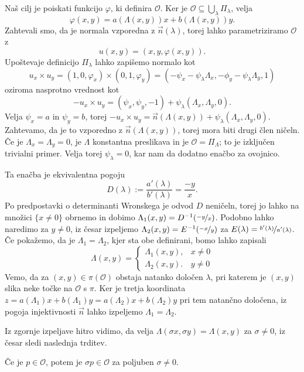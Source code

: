 Naš cilj je poiskati funkcijo $\varphi$, ki definira $\mathcal{O}$.
Ker je $\mathcal{O} \subseteq \bigcup_\lambda \Pi_\lambda$, velja
\[
	\varphi(x, y) = a(\Lambda(x, y)) x + b(\Lambda(x, y)) y.
\]
Zahtevali smo, da je normala vzporedna z $\vec{n}(\lambda)$, torej lahko
parametriziramo $\mathcal{O}$ z
\[
	u(x, y) = (x, y, \varphi(x, y)).
\]
Upoštevaje definicijo $\Pi_\lambda$ lahko zapišemo normalo kot
\[
	u_x \times u_y
	= (1, 0, \varphi_x) \times (0, 1, \varphi_y)
	= (- \psi_x - \psi_\lambda \Lambda_x, -\phi_y - \psi_\lambda \Lambda_y, 1)
\]
oziroma nasprotno vrednost kot
\[
	-u_x \times u_y = (\psi_x, \psi_y, -1) + \psi_\lambda (\Lambda_x, \Lambda_y,
	0).
\]
Velja $\psi_x = a$ in $\psi_y = b$, torej $-u_x \times u_y = \vec{n}(\Lambda(x,
y)) + \psi_\lambda(\Lambda_x, \Lambda_y, 0)$.
Zahtevamo, da je to vzporedno z $\vec{n}(\Lambda(x, y))$, torej mora biti drugi
člen ničeln.
Če je $\Lambda_x = \Lambda_y = 0$, je $\Lambda$ konstantna preslikava in je
$\mathcal{O} = \Pi_\Lambda$; to je izključen trivialni primer.
Velja torej $\psi_\lambda = 0$, kar nam da dodatno enačbo za ovojnico.


Ta enačba je ekvivalentna pogoju
\[
	D(\lambda) := \frac{a'(\lambda)}{b'(\lambda)} = \frac{-y}{x}.
\]
Po predpostavki o determinanti Wronskega je odvod $D$ neničeln, torej jo lahko
na množici $\{x \ne 0\}$ obrnemo in dobimo $\Lambda_1(x, y) =
D^{-1}(\nicefrac{-y}{x})$.
Podobno lahko naredimo za $y \ne 0$, iz česar izpeljemo $\Lambda_2(x, y) =
E^{-1}(\nicefrac{-x}{y})$ za $E(\lambda) = \nicefrac{b'(\lambda)}{a'(\lambda)}$.
Če pokažemo, da je $\Lambda_1 = \Lambda_2$, kjer sta obe definirani, bomo lahko
zapisali
\[
	\Lambda(x, y) =
	\begin{cases}
		\Lambda_1(x, y), & x \ne 0 \\
		\Lambda_2(x, y). & y \ne 0
	\end{cases}
\]
Vemo, da za $(x, y) \in \pi(\mathcal{O})$ obstaja natanko določen $\lambda$, pri
katerem je $(x, y)$ slika neke točke na $\mathcal{O}$ s $\pi$.
Ker je tretja koordinata $z = a(\Lambda_1) x + b(\Lambda_1) y = a(\Lambda_2) x +
b(\Lambda_2) y$ pri tem natančno določena, iz pogoja injektivnosti $\vec{n}$
lahko izpeljemo $\Lambda_1 = \Lambda_2$.

Iz zgornje izpeljave hitro vidimo, da velja $\Lambda(\sigma x, \sigma y) =
\Lambda(x, y)$ za $\sigma \ne 0$, iz česar sledi naslednja trditev.

\begin{trditev}
	Če je $p \in \mathcal{O}$, potem je $\sigma p \in \mathcal{O}$ za poljuben
	$\sigma \ne 0$.
\end{trditev}

